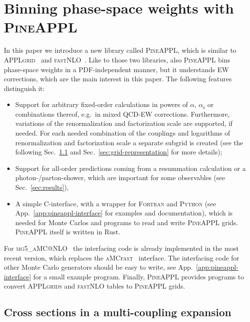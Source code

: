 \section{Binning phase-space weights with \texorpdfstring{\textsc{PineAPPL}}{PineAPPL}}
\label{sec:pineappl}

In this paper we introduce a new library called \textsc{PineAPPL}, which is similar to \textsc{APPLgrid}~\cite{Carli:2010rw} and \textsc{fastNLO}~\cite{Kluge:2006xs,Wobisch:2011ij,Britzger:2012bs}.
Like to those two libraries, also \textsc{PineAPPL} bins phase-space weights in a PDF-independent manner, but it understands EW corrections, which are the main interest in this paper.
The following features distinguish it:
\begin{itemize}
\item Support for arbitrary fixed-order calculations in powers of $\alpha$, $\alpha_\mathrm{s}$ or combinations thereof, e.g.\ in mixed QCD-EW corrections.
Furthermore, variations of the renormalization and factorization scale are supported, if needed.
For each needed combination of the couplings and logarithms of renormalization and factorization scale a separate subgrid is created (see the following Sec.~\ref{sec:multi-coupling-expansion} and Sec.~\ref{sec:grid-representation} for more details);
\item Support for all-order predictions coming from a resummation calculation or a photon-/parton-shower, which are important for some observables (see Sec.~\ref{sec:results}),
\item A simple \textsc{C}-interface, with a wrapper for \textsc{Fortran} and \textsc{Python} (see App.~\ref{app:pineappl-interface} for examples and documentation), which is needed for Monte Carlos and programs to read and write \textsc{PineAPPL} grids.
\textsc{PineAPPL} itself is written in Rust.
\end{itemize}
For \textsc{mg5\_aMC@NLO}~\cite{Alwall:2014hca,Frederix:2018nkq} the interfacing code is already implemented in the most recent version, which replaces the \textsc{aMCfast}~\cite{Bertone:2014zva} interface.
The interfacing code for other Monte Carlo generators should be easy to write, see App.~\ref{app:pineappl-interface} for a small example program.
Finally, \textsc{PineAPPL} provides programs to convert \textsc{APPLgrids} and \textsc{fastNLO} tables to \textsc{PineAPPL} grids.

\subsection{Cross sections in a multi-coupling expansion}
\label{sec:multi-coupling-expansion}

